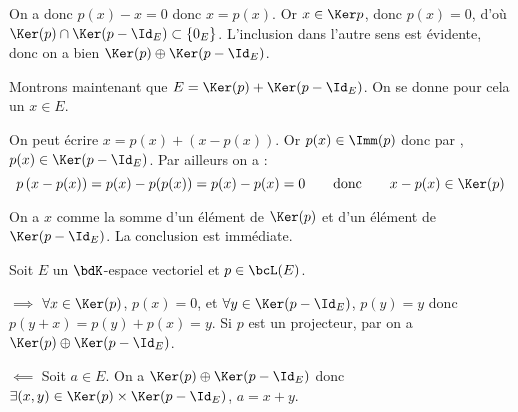\documentclass[a4paper,french,bookmarks]{article}
\begin{document}
\begin{enumerate}
\begin{nproof}
\begin{enumerate}
            On a donc $p(x) - x = 0$ donc $x = p(x)$. Or $x \in \Ker p$,
            donc $p(x) = 0$, d'où $\Ker(p) \cap \Ker(p - \Id_E) \subset
            \{0_E\}$. L'inclusion dans l'autre sens est évidente, donc
            on a bien $\Ker(p) \oplus \Ker(p - \Id_E)$.
            
            \itt Montrons maintenant que $E = \Ker(p) + \Ker(p -
            \Id_E)$. On se donne pour cela un $x \in E$. 
            
            On peut écrire $x = p(x) + \left(x - p(x)\right)$. Or $p(x)
            \in \Imm(p)$ donc par , $p(x) \in \Ker(p -
            \Id_E)$. Par ailleurs on a :
            \[ p\left(x - p(x)\right) = p(x) - p(p(x)) = p(x) - p(x) = 0
            \qquad\text{donc}\qquad x - p(x) \in \Ker(p)\]
        \end{enumerate}
        
        On a $x$ comme la somme d'un élément de $\Ker(p)$ et d'un
        élément de $\Ker(p - \Id_E)$. La conclusion est immédiate.
    \end{nproof}
    \yesafter
    \begin{nproof}
         Soit $E$ un $\bdK$-espace vectoriel et $p \in \bcL(E)$. 
         
         \begin{enumerate}
             \itt $\boxed{\implies}$ $\forall x \in \Ker(p)$, $p(x) =
             0$, et $\forall y \in \Ker(p - \Id_E)$, $p(y) = y$ donc
             $p(y + x) = p(y) + p(x) = y$. Si $p$ est un projecteur, par
              on a $\Ker(p) \oplus \Ker(p - \Id_E)$.
             
             \itt $\boxed{\impliedby}$ Soit $a \in E$. On a $\Ker(p)
             \oplus \Ker(p - \Id_E)$ donc $\exists (x, y) \in
             \Ker(p)\times\Ker(p - \Id_E)$, $a = x + y$.
             

\end{enumerate}
\end{nproof}
\end{enumerate}
\end{document}
